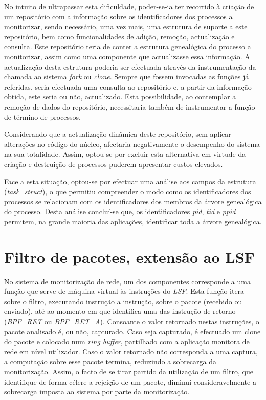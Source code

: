 No intuito de ultrapassar esta dificuldade, poder-se-ia ter recorrido à criação de um repositório com a informação sobre os identificadores dos processos a monitorizar, sendo necessário, uma vez mais, uma estrutura de suporte a este repositório, bem como funcionalidades de adição, remoção, actualização e consulta.
Este repositório teria de conter a estrutura genealógica do processo a monitorizar, assim como uma componente que actualizasse essa informação.
A actualização desta estrutura poderia ser efectuada através da instrumentação da chamada ao sistema \textit{fork} ou \textit{clone}.
Sempre que fossem invocadas as funções já referidas, seria efectuada uma consulta ao repositório e, a partir da informação obtida, este seria ou não, actualizado.
Esta possibilidade, ao contemplar a remoção de dados do repositório, necessitaria também de instrumentar a função de término de processos.

Considerando que a actualização dinâmica deste repositório, sem aplicar alterações no código do núcleo, afectaria negativamente o desempenho do sistema na sua totalidade.
Assim, optou-se por excluir esta alternativa em virtude da criação e destruição de processos puderem apresentar custos elevados.


Face a esta situação, optou-se por efectuar uma análise aos campos da estrutura (\textit{task\_struct}), o que permitiu compreender o modo como os identificadores dos processos se relacionam com os identificadores dos membros da árvore genealógica do processo.
Desta análise concluí-se que, os identificadores \textit{pid}, \textit{tid} e \textit{ppid} permitem, na grande maioria das aplicações, identificar toda a árvore genealógica.




\section{Filtro de pacotes, extensão ao LSF}

No sistema de monitorização de rede, um dos componentes corresponde a uma função que serve de máquina virtual às instruções do \textit{LSF}.
Esta função itera sobre o filtro, executando instrução a instrução, sobre o pacote (recebido ou enviado), até ao momento em que identifica uma das instrução de retorno (\textit{BPF\_RET} ou \textit{BPF\_RET\_A}).
Consoante o valor retornado nestas instruções, o pacote analisado é, ou não, capturado.
Caso seja capturado, é efectuado um clone do pacote e colocado num \textit{ring buffer}, partilhado com a aplicação monitora de rede em nível utilizador.
Caso o valor retornado não corresponda a uma captura, a computação sobre esse pacote termina, reduzindo a sobrecarga da monitorização.
Assim, o facto de se tirar partido da utilização de um filtro, que identifique de forma célere a rejeição de um pacote, diminui consideravelmente a sobrecarga imposta ao sistema por parte da monitorização.

